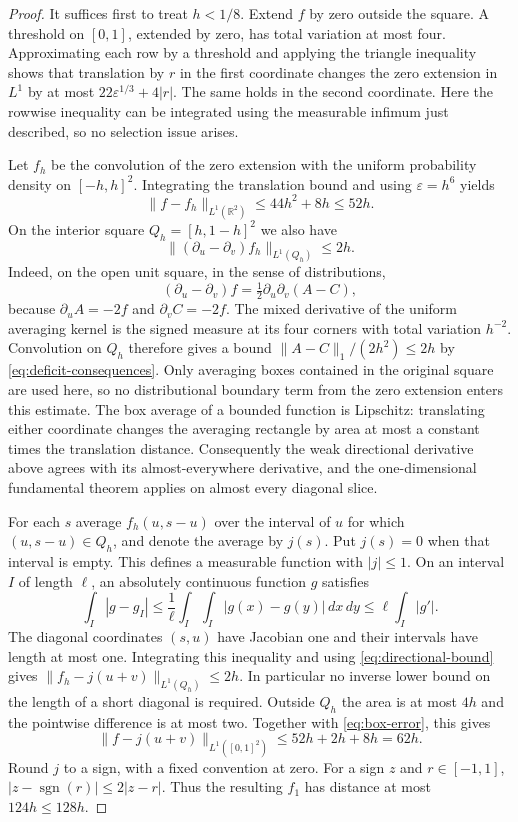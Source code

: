 \begin{proof}
It suffices first to treat $h<1/8$.  Extend $f$ by zero outside the square.
A threshold on $[0,1]$, extended by zero, has total variation at most four.
Approximating each row by a threshold and applying the triangle inequality
shows that translation by $r$ in the first coordinate changes the zero
extension in $L^1$ by at most
$22\varepsilon^{1/3}+4|r|$.  The same holds in the second coordinate.
Here the rowwise inequality can be integrated using the measurable
infimum just described, so no selection issue arises.

Let $f_h$ be the convolution of the zero extension with the uniform
probability density on $[-h,h]^2$.  Integrating the translation bound and
using $\varepsilon=h^6$ yields
\begin{equation}
 \|f-f_h\|_{L^1(\mathbb R^2)}
 \le44h^2+8h\le52h.
 \label{eq:box-error}
\end{equation}
On the interior square $Q_h=[h,1-h]^2$ we also have
\begin{equation}
 \| (\partial_u-\partial_v)f_h\|_{L^1(Q_h)}\le2h.
 \label{eq:directional-bound}
\end{equation}
Indeed, on the open unit square, in the sense of distributions,
\[
 (\partial_u-\partial_v)f
 =\tfrac12\partial_u\partial_v(A-C),
\]
because $\partial_u A=-2f$ and $\partial_v C=-2f$.  The mixed derivative
of the uniform averaging kernel is the signed measure at its four corners
with total variation $h^{-2}$.  Convolution on $Q_h$ therefore gives a bound
$\|A-C\|_1/(2h^2)\le2h$ by \eqref{eq:deficit-consequences}.
Only averaging boxes contained in the original square are used here, so no
distributional boundary term from the zero extension enters this estimate.
The box average of a bounded function is Lipschitz: translating either
coordinate changes the averaging rectangle by area at most a constant
times the translation distance.  Consequently the weak directional
derivative above agrees with its almost-everywhere derivative, and the
one-dimensional fundamental theorem applies on almost every diagonal slice.

For each $s$ average $f_h(u,s-u)$ over the interval of $u$ for which
$(u,s-u)\in Q_h$, and denote the average by $j(s)$.  Put $j(s)=0$ when
that interval is empty.  This defines a measurable function with
$|j|\le1$.  On an interval $I$ of length $\ell$, an absolutely continuous
function $g$ satisfies
\[
 \int_I|g-g_I|
 \le\frac1\ell\int_I\int_I|g(x)-g(y)|\,dx\,dy
 \le\ell\int_I|g'|.
\]
The diagonal coordinates $(s,u)$ have Jacobian one and their intervals
have length at most one.  Integrating this inequality and using
\eqref{eq:directional-bound} gives
$\|f_h-j(u+v)\|_{L^1(Q_h)}\le2h$.  In particular no inverse lower bound
on the length of a short diagonal is required.  Outside $Q_h$ the area is
at most $4h$ and the pointwise difference is at most two.  Together with
\eqref{eq:box-error}, this gives
\[
 \|f-j(u+v)\|_{L^1([0,1]^2)}\le52h+2h+8h=62h.
\]
Round $j$ to a sign, with a fixed convention at zero.  For a sign $z$ and
$r\in[-1,1]$, $|z-\operatorname{sgn}(r)|\le2|z-r|$.  Thus the resulting
$f_1$ has distance at most $124h\le128h$.


\end{proof}
